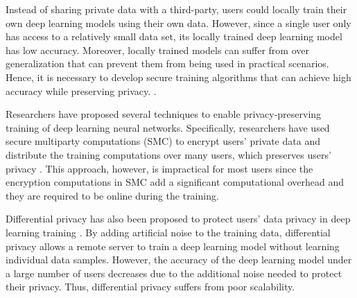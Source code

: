 \documentclass[conference]{IEEEtran}
\begin{document}
Instead of sharing private data with a third-party, users could locally train their own deep learning models using their own
data. However, since a single user only has access to a relatively small data set, its locally 
trained deep learning model has low accuracy. Moreover, locally trained models can suffer from over generalization that can prevent
them from being used in practical scenarios. Hence, it is necessary to develop secure training algorithms that can achieve
high accuracy while preserving privacy.  . 

 
Researchers have proposed several techniques to enable privacy-preserving training of deep learning neural networks. Specifically,  
researchers have used secure multiparty computations (SMC) to encrypt users' private data and distribute the training computations over
many users, which preserves users' privacy 
\cite{ ma2018privacy,sheikh2010distributed,miyajima2016new,bonawitz2017practical}. 
This approach, however, is impractical for most users since the encryption computations in SMC add a significant computational
overhead and they are required to be online during the training.   

Differential privacy has also been proposed to protect users' data privacy in deep learning training
\cite{vepakomma2018no,abadi2016deep,chase2017private}. By adding artificial noise to the training data,
differential privacy allows a remote server to train a deep learning model without learning individual data
samples. However, the accuracy of the deep learning model under a large number of users decreases due
to the additional noise needed to protect their privacy. Thus, differential privacy suffers from poor scalability. 
\end{document}
